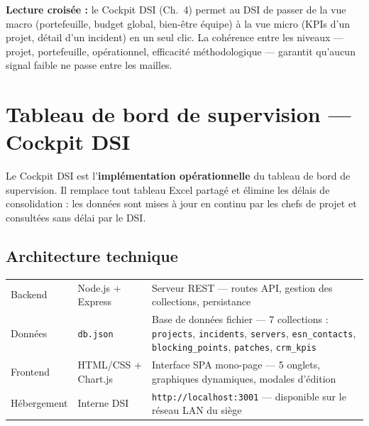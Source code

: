\documentclass[11pt,a4paper,oneside]{report}
\begin{document}
\begin{reco}
\textbf{Lecture croisée :} le Cockpit DSI (Ch.\ 4) permet au DSI de passer de la vue macro (portefeuille, budget global, bien-être équipe) à la vue micro (KPIs d'un projet, détail d'un incident) en un seul clic. La cohérence entre les niveaux --- projet, portefeuille, opérationnel, efficacité méthodologique --- garantit qu'aucun signal faible ne passe entre les mailles.
\end{reco}

\newpage

\chapter{Tableau de bord de supervision --- Cockpit DSI}

\begin{finding}
Le Cockpit DSI est l'\textbf{implémentation opérationnelle} du tableau de bord de supervision. Il remplace tout tableau Excel partagé et élimine les délais de consolidation : les données sont mises à jour en continu par les chefs de projet et consultées sans délai par le DSI.
\end{finding}

\section{Architecture technique}

\vspace{4pt}
\begin{center}
\renewcommand{\arraystretch}{1.5}
\begin{tabularx}{\textwidth}{L{3cm} L{3.5cm} L{7.5cm}}
\toprule
{}
 &  &  \\
\midrule
Backend & Node.js + Express & Serveur REST --- routes API, gestion des collections, persistance \\
Données & \texttt{db.json} & Base de données fichier --- 7 collections : \texttt{projects}, \texttt{incidents}, \texttt{servers}, \texttt{esn\_contacts}, \texttt{blocking\_points}, \texttt{patches}, \texttt{crm\_kpis} \\
Frontend & HTML/CSS + Chart.js & Interface SPA mono-page --- 5 onglets, graphiques dynamiques, modales d'édition \\
Hébergement & Interne DSI & \texttt{http://localhost:3001} --- disponible sur le réseau LAN du siège \\
\bottomrule
\end{tabularx}
\end{center}
\end{document}
